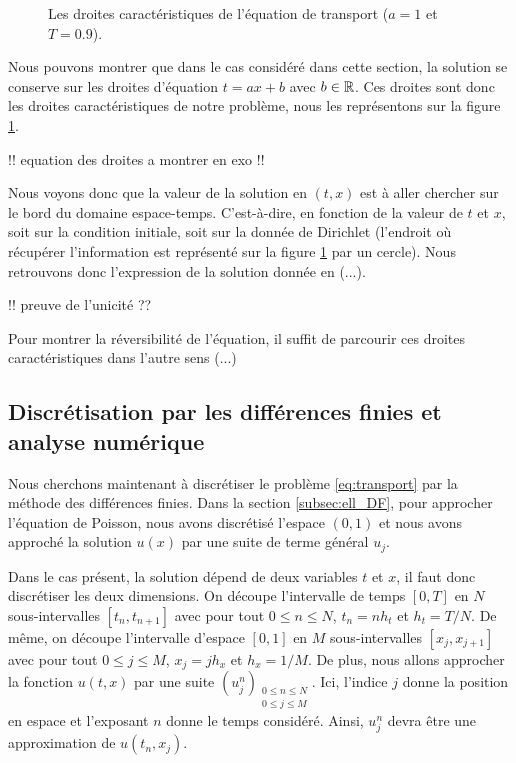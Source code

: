 \documentclass[12pt,a4paper,twoside]{article}
\begin{document}
\begin{figure}
\centering
\begin{tikzpicture}[scale = 9]
  
\end{tikzpicture}
\caption{Les droites caract\'eristiques de l'\'equation de transport
  ($a=1$ et $T=0.9$).}
\label{fig:D_carac}
\end{figure}

Nous pouvons montrer que dans le cas consid\'er\'e dans cette section,
la solution se conserve sur les droites d'\'equation $t=ax+b$ avec $b \in \R$.
Ces droites sont donc les droites caract\'eristiques de notre probl\`eme,
nous les repr\'esentons sur la figure \ref{fig:D_carac}.

!! equation des droites a montrer en exo !!

Nous voyons donc que la valeur de la solution en $(t,x)$ est \`a aller chercher
sur le bord du domaine espace-temps. C'est-\`a-dire, en fonction de la valeur de 
$t$ et $x$, soit sur la condition initiale, soit sur la donn\'ee de Dirichlet
(l'endroit o\`u r\'ecup\'erer l'information est repr\'esent\'e sur la figure
\ref{fig:D_carac} par un cercle).
Nous retrouvons donc l'expression de la solution donn\'ee en (...).


!! preuve de l'unicit\'e ??

Pour montrer la r\'eversibilit\'e de l'\'equation, il suffit de parcourir ces droites 
caract\'eristiques dans l'autre sens (...)

\subsection{Discr\'etisation par les diff\'erences finies et analyse num\'erique}
\label{subsec:transport_DF}

Nous cherchons maintenant \`a discr\'etiser le probl\`eme \eqref{eq:transport}
par la m\'ethode des diff\'erences finies.
Dans la section \ref{subsec:ell_DF}, pour approcher l'\'equation de Poisson,
nous avons discr\'etis\'e l'espace $(0,1)$ et nous avons approch\'e la solution
$u(x)$ par une suite de terme g\'en\'eral $u_j$.

Dans le cas pr\'esent, la solution d\'epend de deux variables $t$ et $x$,
il faut donc discr\'etiser les deux dimensions.
On d\'ecoupe l'intervalle de temps $[0,T]$ en $N$ sous-intervalles $[t_n , t_{n+1}]$
avec pour tout $0\leq n \leq N$,  $t_n = n h_t$ et $h_t = T/N$.
De m\^eme, on d\'ecoupe l'intervalle d'espace $[0,1]$ en $M$ sous-intervalles
$[x_j , x_{j+1}]$ avec pour tout $0 \leq j \leq M$, $x_j = j h_x$ et $h_x = 1/M$. 
De plus, nous allons approcher la fonction $u(t,x)$ par une suite
$(u_j^n)_{\substack{0 \leq n \leq N \\ 0 \leq j \leq M}}$.
Ici, l'indice $j$ donne la position en espace et l'exposant $n$
donne le temps consid\'er\'e. Ainsi, $u_j^n$ devra \^etre une approximation
de $u(t_n, x_j)$.
\end{document}
